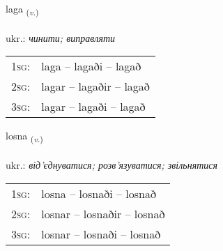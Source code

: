 \documentclass[frontgrid, backgrid]{flacards}\usepackage[]{graphicx}\usepackage[]{xcolor}
\begin{document}
\renewcommand{\flhead}{\vskip5pt \fboxsep=0pt {\small\bfseries\footnotesize Sagnorð | дієслово}}
\renewcommand{\fcfoot}{\vskip5pt \fboxsep=0pt \hspace{2pt}{\small\bfseries\footnotesize 2K}}

\renewcommand{\blhead}{\vskip5pt {\small\bfseries\footnotesize Sagnorð | дієслово }}
\renewcommand{\bcfoot}{\vskip5pt \hspace{2pt}{\small\bfseries\footnotesize 2K}}


{laga \small{\textsubscript{(\textit{v.})}} \\[1ex] %
\textphonetic{[laːɣa]} \\
ukr.: \emph{чинити; виправляти} \\  [2ex]
\renewcommand*{\arraystretch}{0.8}
\begin{tabular}{p{1cm}l}
\textsc{1sg}: & laga -- lagaði -- lagað \\ 
\textsc{2sg}: & lagar -- lagaðir -- lagað \\ 
\textsc{3sg}: & lagar -- lagaði -- lagað \\ 
\end{tabular}
}

\renewcommand{\flhead}{\vskip5pt \fboxsep=0pt {\small\bfseries\footnotesize Sagnorð | дієслово}}
\renewcommand{\fcfoot}{\vskip5pt \fboxsep=0pt \hspace{2pt}{\small\bfseries\footnotesize 2K}}

\renewcommand{\blhead}{\vskip5pt {\small\bfseries\footnotesize Sagnorð | дієслово }}
\renewcommand{\bcfoot}{\vskip5pt \hspace{2pt}{\small\bfseries\footnotesize 2K}}


{losna \small{\textsubscript{(\textit{v.})}} \\[1ex] %
\textphonetic{[lɔstna]} \\
ukr.: \emph{від'єднуватися; розв'язуватися; звільнятися} \\  [2ex]
\renewcommand*{\arraystretch}{0.8}
\begin{tabular}{p{1cm}l}
\textsc{1sg}: & losna -- losnaði -- losnað \\ 
\textsc{2sg}: & losnar -- losnaðir -- losnað \\ 
\textsc{3sg}: & losnar -- losnaði -- losnað \\ 
\end{tabular}
}
\end{document}
